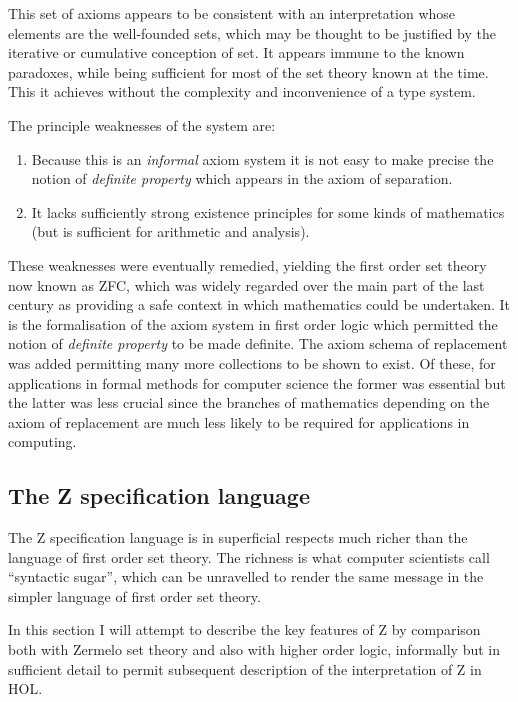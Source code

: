\documentclass[10pt,titlepage]{book}
\begin{document}
This set of axioms appears to be consistent with an interpretation whose elements are the well-founded sets, which may be thought to be justified by the iterative or cumulative conception of set.
It appears immune to the known paradoxes, while being sufficient for most of the set theory known at the time.
This it achieves without the complexity and inconvenience of a type system.

The principle weaknesses of the system are:
\begin{enumerate}
\item Because this is an {\it informal} axiom system it is not easy to make precise the notion of {\it definite property} which appears in the axiom of separation.
\item It lacks sufficiently strong existence principles for some kinds of mathematics (but is sufficient for arithmetic and analysis).
\end{enumerate}

These weaknesses were eventually remedied, yielding the first order set theory now known as ZFC, which was widely regarded over the main part of the last century as providing a safe context in which mathematics could be undertaken.
It is the formalisation of the axiom system in first order logic which permitted the notion of {\it definite property} to be made definite.
The axiom schema of replacement was added permitting many more collections to be shown to exist.
Of these, for applications in formal methods for computer science the former was essential but the latter was less crucial since the branches of mathematics depending on the axiom of replacement are much less likely to be required for applications in computing.

\subsection{The Z specification language}

The Z specification language is in superficial respects much richer than the language of first order set theory.
The richness is what computer scientists call ``syntactic sugar'', which can be unravelled to render the same message in the simpler language of first order set theory.

In this section I will attempt to describe the key features of Z by comparison both with Zermelo set theory and also with higher order logic, informally but in sufficient detail to permit subsequent description of the interpretation of Z in HOL.
\end{document}
